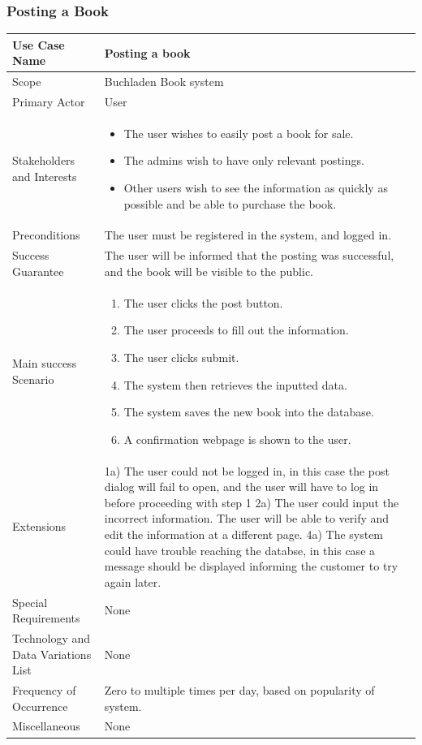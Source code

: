\documentclass[11pt]{article}
\begin{document}
	\subsubsection{Posting a Book}	
		\begin{longtable}{| l | p{8cm} |}
			\hline
			Use Case Name & Posting a book \\ \hline
			Scope & Buchladen Book system \\ \hline
			Primary Actor & User \\ \hline
			Stakeholders and Interests & \begin{itemize}
							\item The user wishes to easily post a book for sale.
							\item The admins wish to have only relevant postings.
							\item Other users wish to see the information as quickly as possible and be able to purchase the book.
						     \end{itemize} \\ \hline
			Preconditions & The user must be registered in the system, and logged in. \\ \hline
			Success Guarantee & The user will be informed that the posting was successful, and the book will be visible to the public. \\ \hline
			Main success Scenario & \begin{enumerate}
							\item The user clicks the post button.
							\item The user proceeds to fill out the information.
							\item The user clicks submit.
							\item The system then retrieves the inputted data.
							\item The system saves the new book into the database.
							\item A confirmation webpage is shown to the user.
						\end{enumerate} \\ \hline
			Extensions & 1a) The user could not be logged in, in this case the post dialog will fail to open, and the user will have to log in before proceeding with step 1 \newline
			2a) The user could input the incorrect information. The user will be able to verify and edit the information at a different page. \newline
			4a) The system could have trouble reaching the databse, in this case a message should be displayed informing the customer to try again later. \\ \hline
			Special Requirements & None \\ \hline
			Technology and Data Variations List & None \\ \hline
			Frequency of Occurrence & Zero to multiple times per day, based on popularity of system. \\ \hline
			Miscellaneous & None \\ \hline
		\end{longtable}
\end{document}
